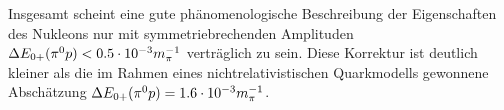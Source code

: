 Insgesamt scheint eine gute ph\"anomenologische Beschreibung 
der Eigenschaften des Nukleons nur mit symmetriebrechenden
Amplituden $\Delta E_{0+}(\pi^0 p) <0.5 \cdot 10^{-3} m_\pi^{-1}$ vertr\"aglich zu sein. Diese Korrektur
ist deutlich kleiner als die im Rahmen eines nichtrelativistischen
Quarkmodells gewonnene Ab\-sch\"a\-tzung $\Delta E_{0+}(\pi^0 p)=1.6\cdot 10^{-3} m_\pi^{-1}$. 
